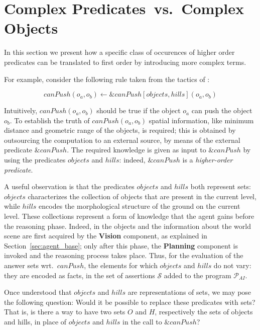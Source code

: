 \section{Complex Predicates~vs.~Complex Objects}
\label{sec:main}

In this section we present how a specific class of occurences of higher order predicates can be translated to first order by introducing more complex terms.

For example, consider the following rule taken from the tactics of \ah:

$$ canPush(o_a,o_b) \leftarrow \&canPush[objects,hills](o_a,o_b) \label{main:rule-1} $$

Intuitively, $canPush(o_a, o_b)$ should be true if the object $o_a$ can push the object $o_b$.
To establish the truth of $canPush(o_a, o_b)$ spatial information, like minimum distance and geometric range of the objects, is required; this is obtained by outsourcing the computation to an external source, by means of the external predicate $\&canPush$.
The required knowledge is given as input to $\&canPush$ by using the predicates $objects$ and $hills$: indeed, $\&canPush$ is a \emph{higher-order predicate}.

A useful observation is that the predicates $objects$ and $hills$ both represent sets: $objects$ characterizes the collection of objects that are present in the current level, while $hills$ encodes the morphological structure of the ground on the current level.
These collections represent a form of knowledge that the agent gains before the reasoning phase.
Indeed, in \ah the objects and the information about the world scene are first acquired by the \textbf{Vision} component, as explained in Section~\ref{sec:agent_base}; only after this phase, the \textbf{Planning} component is invoked and the reasoning process takes place.
Thus, for the evaluation of the answer sets wrt.~$canPush$, the elements for which $objects$ and $hills$ do not vary: they are encoded as facts, in the set of assertions \(\mathcal{S}\) added to the program \(\mathcal{P}_{AI}\).

Once understood that $objects$ and $hills$ are representations of sets, we may pose the following question: Would it be possible to replace these predicates with sets?
That is, is there a way to have two sets $O$ and $H$, respectively the sets of objects and hills, in place of  $objects$ and $hills$ in the call to $\&canPush$?

